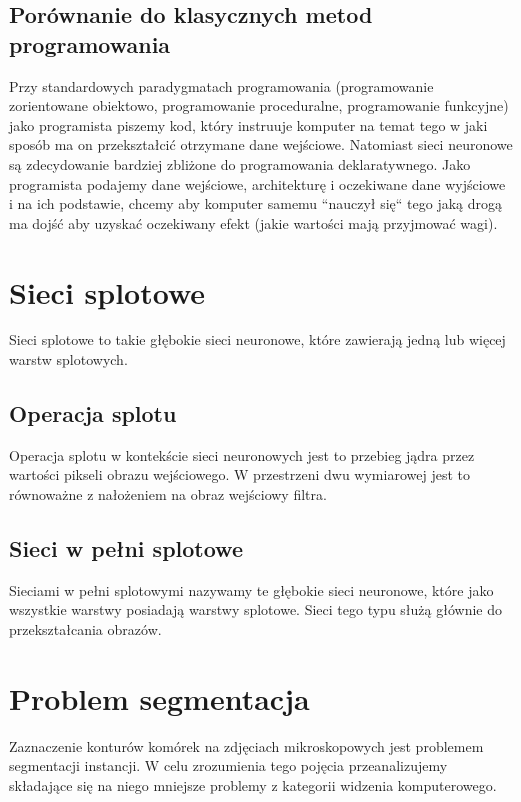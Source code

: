 \documentclass{article}
\begin{document}
\subsection{Porównanie do klasycznych metod programowania}
Przy standardowych paradygmatach programowania (programowanie zorientowane obiektowo, programowanie proceduralne, programowanie funkcyjne) jako programista piszemy kod, który
instruuje komputer na temat tego w jaki sposób ma on przekształcić otrzymane dane wejściowe.
Natomiast sieci neuronowe są zdecydowanie bardziej zbliżone do programowania deklaratywnego. Jako programista podajemy dane wejściowe, architekturę i oczekiwane dane wyjściowe i na ich podstawie, chcemy aby komputer samemu ``nauczył się`` tego jaką drogą ma dojść aby uzyskać oczekiwany efekt (jakie wartości mają przyjmować wagi).
\newpage
\section{Sieci splotowe}
Sieci splotowe to takie głębokie sieci neuronowe, które zawierają jedną lub więcej warstw splotowych.
\subsection{Operacja splotu}
Operacja splotu w kontekście sieci neuronowych jest to przebieg jądra przez wartości pikseli obrazu wejściowego.
W przestrzeni dwu wymiarowej jest to równoważne z nałożeniem na obraz wejściowy filtra.
\subsection{Sieci w pełni splotowe}
Sieciami w pełni splotowymi nazywamy te głębokie sieci neuronowe, które jako wszystkie warstwy posiadają warstwy splotowe.
Sieci tego typu służą głównie do przekształcania obrazów.
\newpage
\section{Problem segmentacja}
Zaznaczenie konturów komórek na zdjęciach mikroskopowych jest problemem segmentacji instancji.
W celu zrozumienia tego pojęcia przeanalizujemy składające się na niego mniejsze problemy z kategorii widzenia komputerowego.
\end{document}
